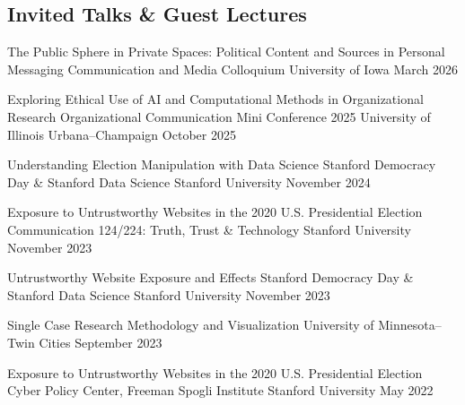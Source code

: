 \subsection{Invited Talks \& Guest Lectures}

\cvtalk
  {The Public Sphere in Private Spaces: Political Content and Sources in Personal Messaging}
  {Communication and Media Colloquium}
  {University of Iowa}
  {March 2026}

\cvtalk
  {Exploring Ethical Use of AI and Computational Methods in Organizational Research}
  {Organizational Communication Mini Conference 2025}
  {University of Illinois Urbana--Champaign}
  {October 2025}

\cvtalk
  {Understanding Election Manipulation with Data Science}
  {Stanford Democracy Day \& Stanford Data Science}
  {Stanford University}
  {November 2024}

\cvtalk
  {Exposure to Untrustworthy Websites in the 2020 U.S. Presidential Election}
  {Communication 124/224: Truth, Trust \& Technology}
  {Stanford University}
  {November 2023}

\cvtalk
  {Untrustworthy Website Exposure and Effects}
  {Stanford Democracy Day \& Stanford Data Science}
  {Stanford University}
  {November 2023}

\cvtalk
  {Single Case Research Methodology and Visualization}
  {}
  {University of Minnesota--Twin Cities}
  {September 2023}

\cvtalk
  {Exposure to Untrustworthy Websites in the 2020 U.S. Presidential Election}
  {Cyber Policy Center, Freeman Spogli Institute}
  {Stanford University}
  {May 2022}

